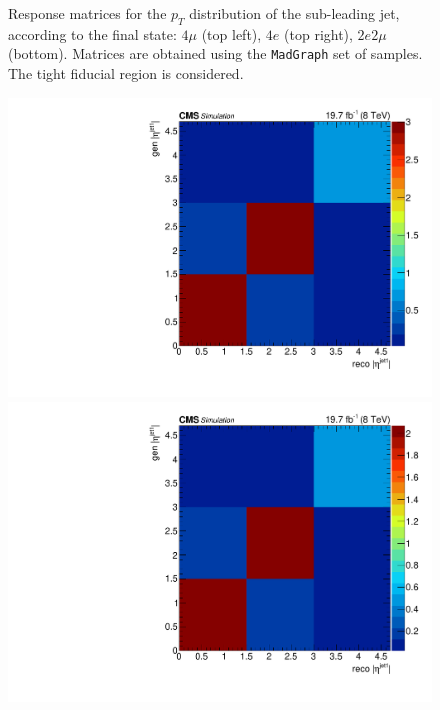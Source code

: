 \begin{figure}[hbtp]
\begin{center}
    \caption{Response matrices for the $p_{T}$ distribution of the sub-leading jet, according to the final state:  $4\mu$ (top left), $4e$ (top right), $2e2\mu$  (bottom). Matrices are obtained using the  \texttt{MadGraph} set of samples. The tight fiducial region is considered.} 
    \label{fig:PtJet2_matrices}
  \end{center}
\end{figure}

\begin{figure}[hbtp]
  \begin{center}
    \includegraphics[width=\cmsFigWidth]{Figures/ResMat_qqggJJ_EtaJet1_ZZTo4m_st_01_fr_Mad}
    \includegraphics[width=\cmsFigWidth]{Figures/ResMat_qqggJJ_EtaJet1_ZZTo4e_st_01_fr_Mad}

\end{center}
\end{figure}
